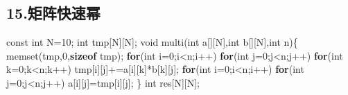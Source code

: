 \documentclass[
]{article}
\newenvironment{Shaded}{}{}
\newcommand{\AttributeTok}[1]{\textcolor[rgb]{0.49,0.56,0.16}{#1}}
\newcommand{\ControlFlowTok}[1]{\textcolor[rgb]{0.00,0.44,0.13}{\textbf{#1}}}
\newcommand{\DataTypeTok}[1]{\textcolor[rgb]{0.56,0.13,0.00}{#1}}
\newcommand{\DecValTok}[1]{\textcolor[rgb]{0.25,0.63,0.44}{#1}}
\newcommand{\KeywordTok}[1]{\textcolor[rgb]{0.00,0.44,0.13}{\textbf{#1}}}
\newcommand{\NormalTok}[1]{#1}
\newcommand{\OperatorTok}[1]{\textcolor[rgb]{0.40,0.40,0.40}{#1}}
\begin{document}
\hypertarget{15ux77e9ux9635ux5febux901fux5e42}{%
\subsection{15.矩阵快速幂}\label{15ux77e9ux9635ux5febux901fux5e42}}

\begin{Shaded}
\begin{Highlighting}[]
\AttributeTok{const} \DataTypeTok{int}\NormalTok{ N}\OperatorTok{=}\DecValTok{10}\OperatorTok{;}
\DataTypeTok{int}\NormalTok{ tmp}\OperatorTok{[}\NormalTok{N}\OperatorTok{][}\NormalTok{N}\OperatorTok{];}
\DataTypeTok{void}\NormalTok{ multi}\OperatorTok{(}\DataTypeTok{int}\NormalTok{ a}\OperatorTok{[][}\NormalTok{N}\OperatorTok{],}\DataTypeTok{int}\NormalTok{ b}\OperatorTok{[][}\NormalTok{N}\OperatorTok{],}\DataTypeTok{int}\NormalTok{ n}\OperatorTok{)\{}
\NormalTok{	memset}\OperatorTok{(}\NormalTok{tmp}\OperatorTok{,}\DecValTok{0}\OperatorTok{,}\KeywordTok{sizeof}\NormalTok{ tmp}\OperatorTok{);}
	\ControlFlowTok{for}\OperatorTok{(}\DataTypeTok{int}\NormalTok{ i}\OperatorTok{=}\DecValTok{0}\OperatorTok{;}\NormalTok{i}\OperatorTok{\textless{}}\NormalTok{n}\OperatorTok{;}\NormalTok{i}\OperatorTok{++)}
		\ControlFlowTok{for}\OperatorTok{(}\DataTypeTok{int}\NormalTok{ j}\OperatorTok{=}\DecValTok{0}\OperatorTok{;}\NormalTok{j}\OperatorTok{\textless{}}\NormalTok{n}\OperatorTok{;}\NormalTok{j}\OperatorTok{++)}
	 		\ControlFlowTok{for}\OperatorTok{(}\DataTypeTok{int}\NormalTok{ k}\OperatorTok{=}\DecValTok{0}\OperatorTok{;}\NormalTok{k}\OperatorTok{\textless{}}\NormalTok{n}\OperatorTok{;}\NormalTok{k}\OperatorTok{++)}
\NormalTok{	 			tmp}\OperatorTok{[}\NormalTok{i}\OperatorTok{][}\NormalTok{j}\OperatorTok{]+=}\NormalTok{a}\OperatorTok{[}\NormalTok{i}\OperatorTok{][}\NormalTok{k}\OperatorTok{]*}\NormalTok{b}\OperatorTok{[}\NormalTok{k}\OperatorTok{][}\NormalTok{j}\OperatorTok{];}
	\ControlFlowTok{for}\OperatorTok{(}\DataTypeTok{int}\NormalTok{ i}\OperatorTok{=}\DecValTok{0}\OperatorTok{;}\NormalTok{i}\OperatorTok{\textless{}}\NormalTok{n}\OperatorTok{;}\NormalTok{i}\OperatorTok{++)}
		\ControlFlowTok{for}\OperatorTok{(}\DataTypeTok{int}\NormalTok{ j}\OperatorTok{=}\DecValTok{0}\OperatorTok{;}\NormalTok{j}\OperatorTok{\textless{}}\NormalTok{n}\OperatorTok{;}\NormalTok{j}\OperatorTok{++)}
\NormalTok{	 		a}\OperatorTok{[}\NormalTok{i}\OperatorTok{][}\NormalTok{j}\OperatorTok{]=}\NormalTok{tmp}\OperatorTok{[}\NormalTok{i}\OperatorTok{][}\NormalTok{j}\OperatorTok{];}
\OperatorTok{\}}
\DataTypeTok{int}\NormalTok{ res}\OperatorTok{[}\NormalTok{N}\OperatorTok{][}\NormalTok{N}\OperatorTok{];}

\end{Highlighting}
\end{Shaded}
\end{document}
